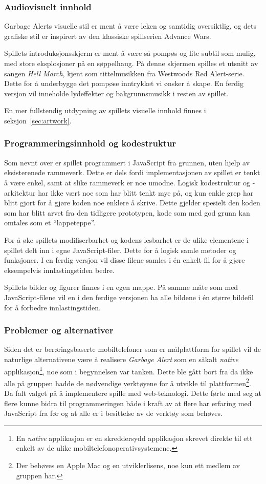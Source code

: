 \subsubsection{Audiovisuelt innhold}
{Garbage Alerts} visuelle stil er ment å være leken og samtidig
oversiktlig, og dets grafiske stil er inspirert av den klassiske
spillserien Advance Wars.

Spillets introduksjonsskjerm er ment å være så pompøs og lite subtil som
mulig, med store eksplosjoner på en søppelhaug. På denne skjermen
spilles et utsnitt av sangen \emph{Hell March}, kjent som tittelmusikken
fra Westwoods Red Alert-serie. Dette for å underbygge det pompøse
inntrykket vi ønsker å skape. En ferdig versjon vil inneholde
lydeffekter og bakgrunnsmusikk i resten av spillet.

En mer fullstendig utdypning av spillets visuelle innhold finnes i
seksjon~\ref{sec:artwork}.


\subsubsection{Programmeringsinnhold og kodestruktur}
Som nevnt over er spillet programmert i JavaScript fra grunnen, uten
hjelp av eksisterenede rammeverk. Dette er dels fordi
implementasjonen av spillet er tenkt å være enkel, samt at slike
rammeverk er noe umodne.  Logisk kodestruktur og -arkitektur har ikke
vært noe som har blitt tenkt mye på, og kun enkle grep har blitt gjort
for å gjøre koden noe enklere å skrive. Dette gjelder spesielt den koden
som har blitt arvet fra den tidligere prototypen, kode som med god grunn
kan omtales som et ``lappeteppe''.

For å øke spillets modifiserbarhet og kodens lesbarhet er de ulike
elementene i spillet delt inn i egne JavaScript-filer. Dette for å
logisk samle metoder og funksjoner. I en ferdig versjon vil disse filene
samles i én enkelt fil for å gjøre eksempelvis innlastingstiden bedre.

Spillets bilder og figurer finnes i en egen mappe. På samme måte som med
JavaScript-filene vil en i den ferdige versjonen ha alle bildene i én
større bildefil for å forbedre innlastingstiden.


\subsubsection{Problemer og alternativer}
Siden det er berøringsbaserte mobiltelefoner som er målplattform for
spillet vil de naturlige alternativene være å realisere \emph{Garbage Alert}
som en såkalt \emph{native} applikasjon\footnote{En \emph{native}
applikasjon er en skreddersydd applikasjon skrevet direkte til ett
enkelt av de ulike mobiltelefonoperativsystemene.}, noe som i
begynnelsen var tanken. Dette ble gått bort fra da ikke alle på gruppen
hadde de nødvendige verktøyene for å utvikle til
plattformen\footnote{Der behøves en Apple Mac og en utviklerlisens, noe
kun ett medlem av gruppen har.}. Da falt valget på å implementere
spille med web-teknologi. Dette førte med seg at flere kunne bidra til
programmeringen både i kraft av at flere har erfaring med JavaScript
fra før og at alle er i besittelse av de verktøy som behøves.

